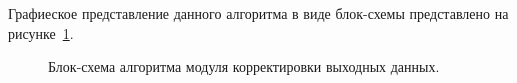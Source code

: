 Графиеское представление данного алгоритма в виде блок-схемы представлено на рисунке~\ref{pic:correctAlgo}.

\begin{figure}[H]
\caption{Блок-схема алгоритма модуля корректировки выходных данных.}
\label{pic:correctAlgo}
\end{figure}
